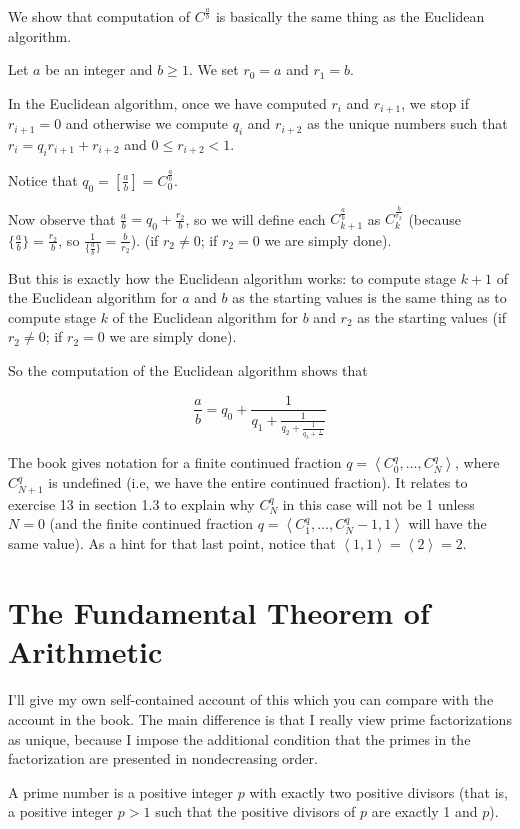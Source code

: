 \documentclass[12pt]{article}
\begin{document}
We show that computation of $C^{\frac ab}$ is basically the same thing as the Euclidean algorithm.  

Let $a$ be an integer and $b \geq 1$.  We set $r_0=a$ and $r_1 = b$.

In the Euclidean algorithm, once we have computed $r_i$ and $r_{i+1}$, we stop if $r_{i+1}=0$ and otherwise we compute
$q_i$ and $r_{i+2}$ as the unique numbers such that $r_i = q_ir_{i+1} + r_{i+2}$ and $0 \leq r_{i+2} < 1$.

Notice that $q_0 = [\frac ab] = C^{\frac ab}_0$.

Now observe that $\frac ab = q_0 + \frac{r_2}b$, so we will define each $C_{k+1}^{\frac ab}$ as $C^{\frac b{r_{2}}}_k$ (because $\{\frac ab\} = \frac{r_2}b$, so $\frac1{\{\frac ab\}}= \frac b{r_2}$). (if $r_{2}\neq 0$;  if $r_2=0$ we are simply done).

But this is exactly how the Euclidean algorithm works:  to compute stage $k+1$ of the Euclidean algorithm for $a$ and $b$ as the starting values
is the same thing as to compute stage $k$ of the Euclidean algorithm for $b$ and $r_{2}$ as the starting values (if $r_{2} \neq 0$; if $r_2=0$ we are simply done).

So the computation of the Euclidean algorithm shows that

$$\frac ab =  q_0 +\frac1{q_1 +\frac1{q_2 +\frac1{q_3 +\frac1{\ldots}}}}$$

The book gives notation for a finite continued fraction $q=\left<C^q_0,\ldots,C^q_N\right>$, where $C^q_{N+1}$ is undefined (i.e, we have the entire continued fraction).
It relates to exercise 13 in section 1.3 to explain why $C^q_N$ in this case will not be 1 unless $N=0$ (and the finite continued fraction $q=\left<C^q_1,\ldots,C^q_N-1,1\right>$ will have the same value).  As a hint for that last point, notice that $\left<1,1\right>=\left<2\right>=2$.

\section{The Fundamental Theorem of Arithmetic}

I'll give my own self-contained account of this which you can compare with the account in the book.  The main difference is that I really view prime factorizations as unique, because I impose the additional condition that the primes in the factorization are presented in nondecreasing order.

A prime number is a positive integer $p$ with exactly two positive divisors (that is, a positive integer $p>1$ such that the positive divisors of $p$ are exactly 1 and $p$).
\end{document}
